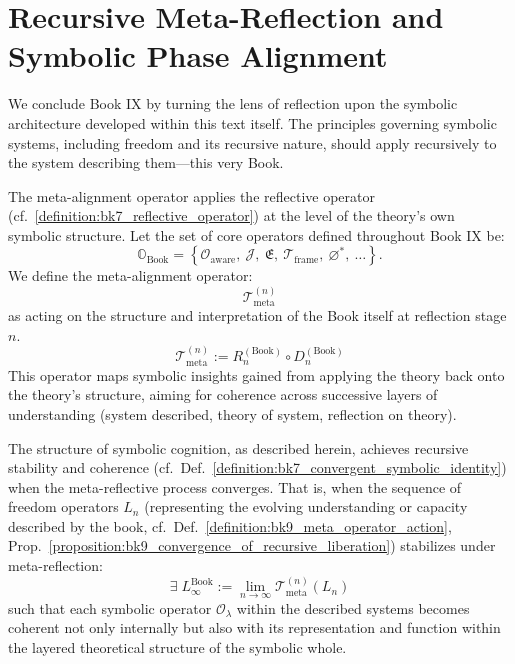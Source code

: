 \section{Recursive Meta-Reflection and Symbolic Phase Alignment}
\label{sec:bk9_recursive_meta_reflection_and_symbolic_phase_alignment}
We conclude Book IX by turning the lens of reflection upon the symbolic architecture developed within this text itself. The principles governing symbolic systems, including freedom and its recursive nature, should apply recursively to the system describing them—this very Book.
\begin{definition}\label{definition:bk9_meta_reflective_alignment}
The meta-alignment operator applies the reflective operator (cf.~\ref{definition:bk7_reflective_operator}) at the level of the theory's own symbolic structure.
Let the set of core operators defined throughout Book IX be:
\[
\mathbb{O}_{\text{Book}} 
= \left\{ 
  \mathcal{O}_{\text{aware}},\ 
  \mathcal{J},\ 
  \mathfrak{E},\ 
  \mathcal{T}_{\text{frame}},\ 
  \varnothing^*,\ 
  \dots 
\right\}.
\]
We define the meta-alignment operator:
\[
\mathcal{T}^{(n)}_{\text{meta}}
\]
as acting on the structure and interpretation of the Book itself at reflection stage \( n \).
\[
\mathcal{T}^{(n)}_{\text{meta}} := R_n^{(\text{Book})} \circ D_n^{(\text{Book})}
\]
This operator maps symbolic insights gained from applying the theory back onto the theory's structure, aiming for coherence across successive layers of understanding (system described, theory of system, reflection on theory).
\end{definition}
\begin{axiom}[Recursive Phase Continuity]
\label{axiom:bk9_recursive_phase_continuity}
The structure of symbolic cognition, as described herein, achieves recursive stability and coherence (cf.~Def.~\ref{definition:bk7_convergent_symbolic_identity}) when the meta-reflective process converges. That is, when the sequence of freedom operators $L_n$ (representing the evolving understanding or capacity described by the book, cf.~Def.~\ref{definition:bk9_meta_operator_action}, Prop.~\ref{proposition:bk9_convergence_of_recursive_liberation}) 
stabilizes under meta-reflection:
\[
\exists \; L_\infty^{\text{Book}} := \lim_{n \to \infty} \mathcal{T}^{(n)}_{\text{meta}}(L_n)
\]
such that each symbolic operator $\mathcal{O}_\lambda$ within the described systems becomes coherent not only internally but also with its representation and function within the layered theoretical structure of the symbolic whole.
\end{axiom}
